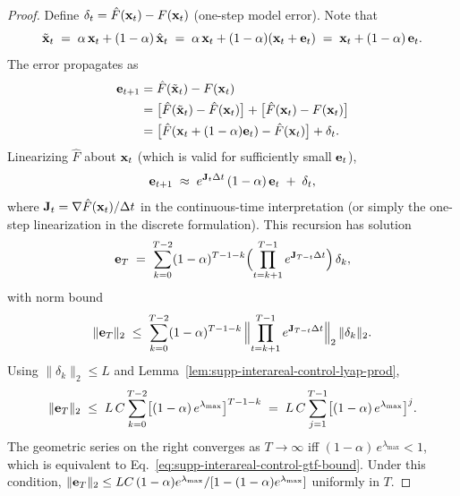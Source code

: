 \begin{proof}
Define $\delta_{t}=\hat{F}(\vb{x}_{t})-F(\vb{x}_{t})$ (one-step model error). Note that
\begin{equation}
\tilde{\vb{x}}_{t} \;=\; \alpha\,\vb{x}_{t}+(1-\alpha)\,\hat{\vb{x}}_{t} \;=\; \alpha\,\vb{x}_{t}+(1-\alpha)(\vb{x}_{t}+\vb{e}_{t}) \;=\; \vb{x}_{t}+(1-\alpha)\,\vb{e}_{t}.
\end{equation}
The error propagates as
\begin{align}
\vb{e}_{t+1} &= \hat{F}(\tilde{\vb{x}}_{t})-F(\vb{x}_{t}) \\
&= \bigl[\hat{F}(\tilde{\vb{x}}_{t})-\hat{F}(\vb{x}_{t})\bigr]+\bigl[\hat{F}(\vb{x}_{t})-F(\vb{x}_{t})\bigr] \\
&= \bigl[\hat{F}(\vb{x}_{t}+(1-\alpha)\vb{e}_{t})-\hat{F}(\vb{x}_{t})\bigr]+\delta_{t}.
\end{align}
Linearizing $\hat{F}$ about $\vb{x}_{t}$ (which is valid for sufficiently small $\vb{e}_{t}$),
\begin{equation}
\vb{e}_{t+1} \;\approx\; e^{\mathbf{J}_{t}\Delta t}\,(1-\alpha)\,\vb{e}_{t} \;+\; \delta_{t},
\end{equation}
where $\mathbf{J}_{t}=\nabla\hat{F}(\vb{x}_{t})/\Delta t$ in the continuous-time interpretation (or simply the one-step linearization in the discrete formulation). This recursion has solution
\begin{equation}
\vb{e}_{T} \;=\; \sum_{k=0}^{T-2} (1-\alpha)^{T-1-k}\Bigl(\prod_{t=k+1}^{T-1} e^{\mathbf{J}_{T-t}\Delta t}\Bigr)\,\delta_{k},
\end{equation}
with norm bound
\begin{equation}
\|\vb{e}_{T}\|_{2} \;\leq\; \sum_{k=0}^{T-2} (1-\alpha)^{T-1-k}\,\Bigl\|\prod_{t=k+1}^{T-1} e^{\mathbf{J}_{T-t}\Delta t}\Bigr\|_{2}\,\|\delta_{k}\|_{2}.
\end{equation}
Using $\|\delta_{k}\|_{2}\leq L$ and Lemma~\ref{lem:supp-interareal-control-lyap-prod},
\begin{equation}
\|\vb{e}_{T}\|_{2} \;\leq\; L\,C \sum_{k=0}^{T-2} \bigl[(1-\alpha)\,e^{\lambda_{\max}}\bigr]^{T-1-k} \;=\; L\,C \sum_{j=1}^{T-1}\bigl[(1-\alpha)\,e^{\lambda_{\max}}\bigr]^{j}.
\end{equation}
The geometric series on the right converges as $T\to\infty$ iff $(1-\alpha)\,e^{\lambda_{\max}}<1$, which is equivalent to Eq.~\ref{eq:supp-interareal-control-gtf-bound}. Under this condition, $\|\vb{e}_{T}\|_{2}\leq LC\,(1-\alpha)e^{\lambda_{\max}}/[1-(1-\alpha)e^{\lambda_{\max}}]$ uniformly in $T$. \end{proof}

